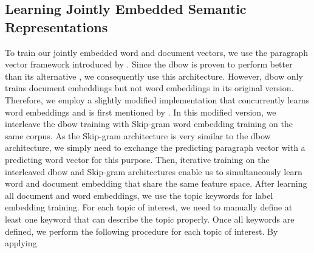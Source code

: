\documentclass[a4paper,twoside]{article}
\begin{document}
\subsection{Learning Jointly Embedded Semantic Representations}

To train our jointly embedded word and document vectors, we use the paragraph vector framework introduced by \citet{Le-Mikolov-2014}. Since the \ac{dbow} is proven to perform better than its alternative \citep{lau-baldwin-2016-empirical}, we consequently use this architecture. However, \ac{dbow} only trains document embeddings but not word embeddings in its original version. Therefore, we employ a slightly modified implementation that concurrently learns word embeddings and is first mentioned by \citet{dai2015document}. In this modified version, we interleave the \ac{dbow} training with Skip-gram \citep{mikolov2013efficient} word embedding training on the same corpus. As the Skip-gram architecture is very similar to the \ac{dbow} architecture, we simply need to exchange the predicting paragraph vector with a predicting word vector for this purpose. Then, iterative training on the interleaved \ac{dbow} and Skip-gram architectures enable us to simultaneously learn word and document embedding that share the same feature space. \newline
\newline After learning all document and word embeddings, we use the topic keywords for label embedding training. For each topic of interest, we need to manually define at least one keyword that can describe the topic properly. Once all keywords are defined, we perform the following procedure for each topic of interest. By applying
\end{document}
